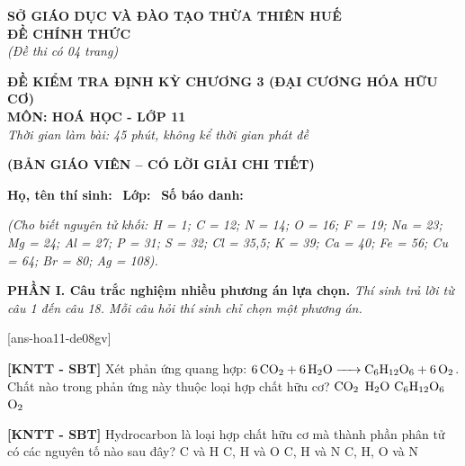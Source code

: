 \documentclass[12pt,a4paper]{article}
\begin{document}
\thispagestyle{firstpage}

\noindent
\begin{minipage}[t]{0.44\textwidth}
	\centering\fontsize{10pt}{12pt}\selectfont
	\textbf{SỞ GIÁO DỤC VÀ ĐÀO TẠO THỪA THIÊN HUẾ}\\
	\textbf{ĐỀ CHÍNH THỨC}\\
	\textit{(Đề thi có 04 trang)}
\end{minipage}\hfill
\begin{minipage}[t]{0.54\textwidth}
	\centering\fontsize{10.5pt}{13pt}\selectfont
	\textbf{ĐỀ KIỂM TRA ĐỊNH KỲ CHƯƠNG 3 (ĐẠI CƯƠNG HÓA HỮU CƠ)}\\
	\textbf{MÔN: HOÁ HỌC - LỚP 11}\\
	\textit{Thời gian làm bài: 45 phút, không kể thời gian phát đề}
	
	\smallskip
\end{minipage}

\smallskip
\begin{center}
	{\color{hfRed}\textbf{\large (BẢN GIÁO VIÊN -- CÓ LỜI GIẢI CHI TIẾT)}}
\end{center}

\smallskip
\noindent\hrulefill
\smallskip

\noindent\textbf{Họ, tên thí sinh:} \dotfill\ \textbf{Lớp:} \dotfill\ \textbf{Số báo danh:} \dotfill

\smallskip
\noindent\textit{(Cho biết nguyên tử khối: H = 1; C = 12; N = 14; O = 16; F = 19; Na = 23; Mg = 24; Al = 27; P = 31; S = 32; Cl = 35,5; K = 39; Ca = 40; Fe = 56; Cu = 64; Br = 80; Ag = 108).}
\smallskip

\noindent\textbf{\large PHẦN I. Câu trắc nghiệm nhiều phương án lựa chọn.}
\textit{Thí sinh trả lời từ câu 1 đến câu 18. Mỗi câu hỏi thí sinh chỉ chọn một phương án.}
\vspace{0.2cm}

[ans-hoa11-de08gv]

\begin{ex}
\textbf{[KNTT - SBT]} Xét phản ứng quang hợp: $\ce{6CO2 + 6H2O -> C6H12O6 + 6O2}$. Chất nào trong phản ứng này thuộc loại hợp chất hữu cơ?
\choice
{$\ce{CO2}$}
{$\ce{H2O}$}
{\True $\ce{C6H12O6}$}
{$\ce{O2}$}

\end{ex}

\begin{ex}
\textbf{[KNTT - SBT]} Hydrocarbon là loại hợp chất hữu cơ mà thành phần phân tử có các nguyên tố nào sau đây?
\choice
{\True C và H}
{C, H và O}
{C, H và N}
{C, H, O và N}

\end{ex}
\end{document}
